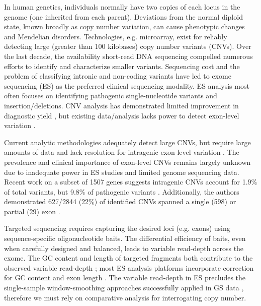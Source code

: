\documentclass{article}\usepackage[]{graphicx}\usepackage[]{color}
\begin{document}
In human genetics, individuals normally have two copies of each locus in the genome (one inherited from each parent).
Deviations from the normal diploid state, known broadly as copy number variation, can cause phenotypic changes and Mendelian disorders.
Technologies, e.g. microarray, exist for reliably detecting large (greater than 100 kilobases) copy number variants (CNVs).
Over the last decade, the availability short-read DNA sequencing compelled numerous efforts to identify and characterize smaller variants.
Sequencing cost and the problem of classifying intronic and non-coding variants have led to exome sequencing (ES) as the preferred clinical sequencing modality.
ES analysis most often focuses on identifying pathogenic single-nucleotide variants and insertion/deletions.
CNV analysis has demonstrated limited improvement in diagnostic yield \cite{marchuk:2018aa}, but existing data/analysis lacks power to detect exon-level variation \cite{retterer:2015aa,yao:2017aa}.

Current analytic methodologies adequately detect large CNVs, but require large amounts of data and lack resolution for intragenic exon-level variation \cite{plagnol:2012aa,krumm:2012aa,fromer:2012aa,jiang:2015aa}.
The prevalence and clinical importance of exon-level CNVs remains largely unknown due to inadequate power in ES studies and limited genome sequencing data.
Recent work on a subset of 1507 genes suggests intragenic CNVs account for 1.9\% of total variants, but 9.8\% of pathogenic variants \cite{truty:2019aa}.
Additionally, the authors demonstrated 627/2844 (22\%) of identified CNVs spanned a single (598) or partial (29) exon \cite{truty:2019aa}.

Targeted sequencing requires capturing the desired loci (e.g. exons) using sequence-specific oligonucleotide baits.
The differential efficiency of baits, even when carefully designed and balanced, leads to variable read-depth across the exome.
The GC content and length of targeted fragments both contribute to the observed variable read-depth \cite{benjamini:2012aa}; most ES analysis platforms incorporate correction for GC content and exon length \cite{kadalayil:2015aa}.
The variable read-depth in ES precludes the single-sample window-smoothing approaches successfully applied in GS data \cite{chiang:2009aa}, therefore we must rely on comparative analysis for interrogating copy number.
\end{document}
